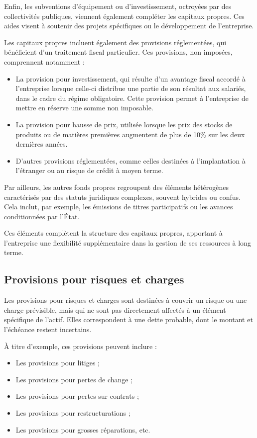 \documentclass[a4paper, 12pt]{report}
\begin{document}
Enfin, les subventions d'équipement ou d'investissement, octroyées par des collectivités publiques, viennent également compléter les capitaux propres. Ces aides visent à soutenir des projets spécifiques ou le développement de l'entreprise.

Les capitaux propres incluent également des provisions réglementées, qui bénéficient d'un traitement fiscal particulier. Ces provisions, non imposées, comprennent notamment :

\begin{itemize}
	\item La provision pour investissement, qui résulte d’un avantage fiscal accordé à l’entreprise lorsque celle-ci distribue une partie de son résultat aux salariés, dans le cadre du régime obligatoire. Cette provision permet à l’entreprise de mettre en réserve une somme non imposable.
	\item La provision pour hausse de prix, utilisée lorsque les prix des stocks de produits ou de matières premières augmentent de plus de 10\% sur les deux dernières années.
	\item D'autres provisions réglementées, comme celles destinées à l’implantation à l’étranger ou au risque de crédit à moyen terme.
\end{itemize}

Par ailleurs, les autres fonds propres regroupent des éléments hétérogènes caractérisés par des statuts juridiques complexes, souvent hybrides ou confus. Cela inclut, par exemple, les émissions de titres participatifs ou les avances conditionnées par l'État.

Ces éléments complètent la structure des capitaux propres, apportant à l’entreprise une flexibilité supplémentaire dans la gestion de ses ressources à long terme.

\subsection{Provisions pour risques et charges}

Les provisions pour risques et charges sont destinées à couvrir un risque ou une charge prévisible, mais qui ne sont pas directement affectés à un élément spécifique de l'actif. Elles correspondent à une dette probable, dont le montant et l'échéance restent incertains.

À titre d'exemple, ces provisions peuvent inclure : 
\begin{itemize}
	\item Les provisions pour litiges ;
	\item Les provisions pour pertes de change ;
	\item Les provisions pour pertes sur contrats ;
	\item Les provisions pour restructurations ;
	\item Les provisions pour grosses réparations, etc.
\end{itemize}
\end{document}
